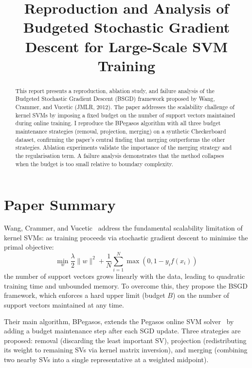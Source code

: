 \documentclass[conference,10pt]{IEEEtran}
\begin{document}
\title{Reproduction and Analysis of Budgeted Stochastic Gradient Descent for Large-Scale SVM Training}

\author{
}

\maketitle

\begin{abstract}
This report presents a reproduction, ablation study, and failure analysis of the Budgeted Stochastic Gradient Descent (BSGD) framework proposed by Wang, Crammer, and Vucetic (JMLR, 2012). The paper addresses the scalability challenge of kernel SVMs by imposing a fixed budget on the number of support vectors maintained during online training. I reproduce the BPegasos algorithm with all three budget maintenance strategies (removal, projection, merging) on a synthetic Checkerboard dataset, confirming the paper's central finding that merging outperforms the other strategies. Ablation experiments validate the importance of the merging strategy and the regularisation term. A failure analysis demonstrates that the method collapses when the budget is too small relative to boundary complexity.
\end{abstract}

\section{Paper Summary}

Wang, Crammer, and Vucetic~\cite{wang2012} address the fundamental scalability limitation of kernel SVMs: as training proceeds via stochastic gradient descent to minimise the primal objective:
\begin{equation}
\min_w \frac{\lambda}{2} \|w\|^2 + \frac{1}{N} \sum_{i=1}^N \max(0, 1 - y_i f(x_i))
\end{equation}
the number of support vectors grows linearly with the data, leading to quadratic training time and unbounded memory. To overcome this, they propose the BSGD framework, which enforces a hard upper limit (budget $B$) on the number of support vectors maintained at any time.

Their main algorithm, BPegasos, extends the Pegasos online SVM solver~\cite{pegasos2011} by adding a budget maintenance step after each SGD update. Three strategies are proposed: removal (discarding the least important SV), projection (redistributing its weight to remaining SVs via kernel matrix inversion), and merging (combining two nearby SVs into a single representative at a weighted midpoint).
\end{document}
